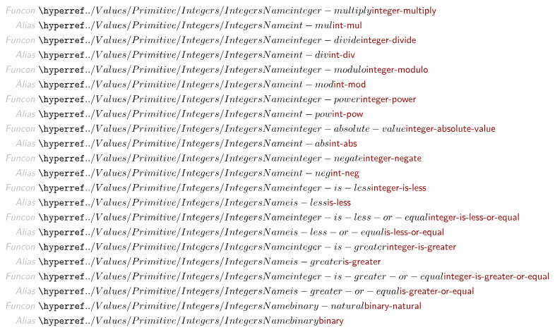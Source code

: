 \begin{align*}
  \KEY{Funcon} ~ & \NAMEHYPER{../Values/Primitive}{Integers}{integer-multiply} \\
  \KEY{Alias} ~ & \NAMEHYPER{../Values/Primitive}{Integers}{int-mul} \\
  \KEY{Funcon} ~ & \NAMEHYPER{../Values/Primitive}{Integers}{integer-divide} \\
  \KEY{Alias} ~ & \NAMEHYPER{../Values/Primitive}{Integers}{int-div} \\
  \KEY{Funcon} ~ & \NAMEHYPER{../Values/Primitive}{Integers}{integer-modulo} \\
  \KEY{Alias} ~ & \NAMEHYPER{../Values/Primitive}{Integers}{int-mod} \\
  \KEY{Funcon} ~ & \NAMEHYPER{../Values/Primitive}{Integers}{integer-power} \\
  \KEY{Alias} ~ & \NAMEHYPER{../Values/Primitive}{Integers}{int-pow} \\
  \KEY{Funcon} ~ & \NAMEHYPER{../Values/Primitive}{Integers}{integer-absolute-value} \\
  \KEY{Alias} ~ & \NAMEHYPER{../Values/Primitive}{Integers}{int-abs} \\
  \KEY{Funcon} ~ & \NAMEHYPER{../Values/Primitive}{Integers}{integer-negate} \\
  \KEY{Alias} ~ & \NAMEHYPER{../Values/Primitive}{Integers}{int-neg} \\
  \KEY{Funcon} ~ & \NAMEHYPER{../Values/Primitive}{Integers}{integer-is-less} \\
  \KEY{Alias} ~ & \NAMEHYPER{../Values/Primitive}{Integers}{is-less} \\
  \KEY{Funcon} ~ & \NAMEHYPER{../Values/Primitive}{Integers}{integer-is-less-or-equal} \\
  \KEY{Alias} ~ & \NAMEHYPER{../Values/Primitive}{Integers}{is-less-or-equal} \\
  \KEY{Funcon} ~ & \NAMEHYPER{../Values/Primitive}{Integers}{integer-is-greater} \\
  \KEY{Alias} ~ & \NAMEHYPER{../Values/Primitive}{Integers}{is-greater} \\
  \KEY{Funcon} ~ & \NAMEHYPER{../Values/Primitive}{Integers}{integer-is-greater-or-equal} \\
  \KEY{Alias} ~ & \NAMEHYPER{../Values/Primitive}{Integers}{is-greater-or-equal} \\
  \KEY{Funcon} ~ & \NAMEHYPER{../Values/Primitive}{Integers}{binary-natural} \\
  \KEY{Alias} ~ & \NAMEHYPER{../Values/Primitive}{Integers}{binary} \\

\end{align*}
